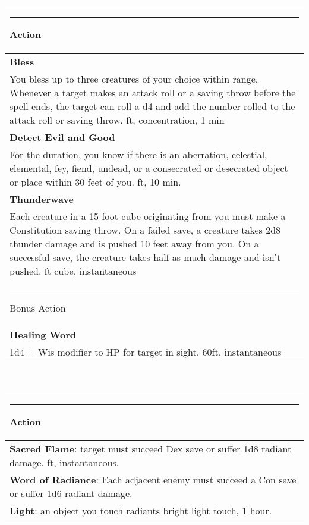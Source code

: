 \documentclass[twocolumn]{article}
\begin{document}
\\
\noindent\begin{tabular}{|m{3.1in}|}
\hline
\rule{1.25in}{0pt}Action\\
\hline
\textbf{Bless}\\
You bless up to three creatures of your choice within range. Whenever a target makes an attack roll or a saving throw before the spell ends, the target can roll a d4 and add the number rolled to the attack roll or saving throw.  {\sc 30 ft, concentration, 1 min}\\
\textbf{Detect Evil and Good}\\
For the duration, you know if there is an aberration, celestial, elemental, fey, fiend, undead, or a consecrated or desecrated object or place within 30 feet of you.  {\sc 30 ft, 10 min}.\\
\textbf{Thunderwave}\\
Each creature in a 15-foot cube originating from you must make a Constitution saving throw. On a failed save, a creature takes 2d8 thunder damage and is pushed 10 feet away from you. On a successful save, the creature takes half as much damage and isn't pushed. {\sc 15 ft cube, instantaneous}\\
\hline
\rule{1.1in}{0pt}Bonus Action\\
\hline
\textbf{Healing Word}\\
1d4  + Wis modifier to HP for target in sight. {\sc 60ft, instantaneous}\\
\hline
\end{tabular}
\vspace{8pt}

\\
\noindent\begin{tabular}{|m{3.1in}|}
\hline
\rule{1.25in}{0pt}Action\\
\hline
\textbf{Sacred Flame}: target must succeed Dex save or suffer 1d8 radiant damage. {\sc 60 ft, instantaneous.}\\
\hline
\textbf{Word of Radiance}: Each adjacent enemy must succeed a Con save or suffer 1d6 radiant damage.\\
\hline
\textbf{Light}: an object you touch radiants bright light {\sc touch, 1 hour.}\\
\hline
\end{tabular}
\vspace{8pt}
\end{document}
